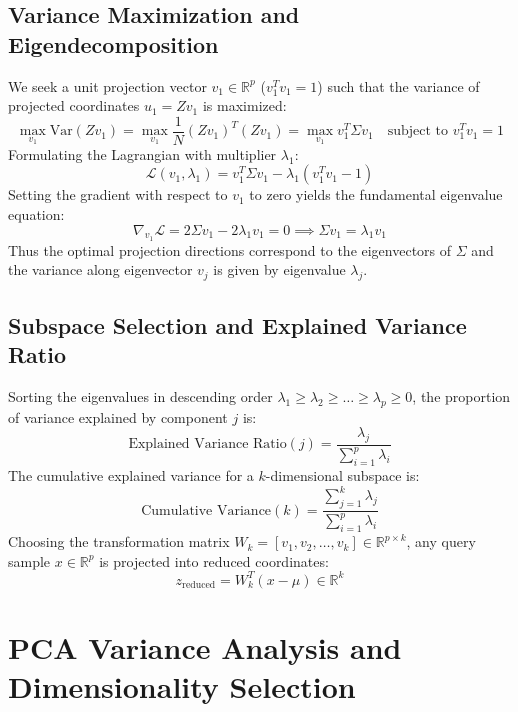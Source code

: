 \documentclass[12pt,a4paper]{article}
\begin{document}
\subsection{Variance Maximization and Eigendecomposition}
We seek a unit projection vector $v_1 \in \mathbb{R}^p$ ($v_1^T v_1 = 1$) such that the variance of projected coordinates $u_1 = Z v_1$ is maximized:
\begin{equation}
\max_{v_1} \text{Var}(Z v_1) = \max_{v_1} \frac{1}{N} (Z v_1)^T (Z v_1) = \max_{v_1} v_1^T \Sigma v_1 \quad \text{subject to } v_1^T v_1 = 1
\end{equation}
Formulating the Lagrangian with multiplier $\lambda_1$:
\begin{equation}
\mathcal{L}(v_1, \lambda_1) = v_1^T \Sigma v_1 - \lambda_1 (v_1^T v_1 - 1)
\end{equation}
Setting the gradient with respect to $v_1$ to zero yields the fundamental eigenvalue equation:
\begin{equation}
\nabla_{v_1} \mathcal{L} = 2 \Sigma v_1 - 2 \lambda_1 v_1 = 0 \implies \Sigma v_1 = \lambda_1 v_1
\end{equation}
Thus the optimal projection directions correspond to the eigenvectors of $\Sigma$ and the variance along eigenvector $v_j$ is given by eigenvalue $\lambda_j$.

\subsection{Subspace Selection and Explained Variance Ratio}
Sorting the eigenvalues in descending order $\lambda_1 \ge \lambda_2 \ge \dots \ge \lambda_p \ge 0$, the proportion of variance explained by component $j$ is:
\begin{equation}
\text{Explained Variance Ratio}(j) = \frac{\lambda_j}{\sum_{i=1}^p \lambda_i}
\end{equation}
The cumulative explained variance for a $k$-dimensional subspace is:
\begin{equation}
\text{Cumulative Variance}(k) = \frac{\sum_{j=1}^k \lambda_j}{\sum_{i=1}^p \lambda_i}
\end{equation}
Choosing the transformation matrix $W_k = [v_1, v_2, \dots, v_k] \in \mathbb{R}^{p \times k}$, any query sample $x \in \mathbb{R}^p$ is projected into reduced coordinates:
\begin{equation}
z_{\text{reduced}} = W_k^T (x - \mu) \in \mathbb{R}^k
\end{equation}

\section{PCA Variance Analysis and Dimensionality Selection}
\end{document}
